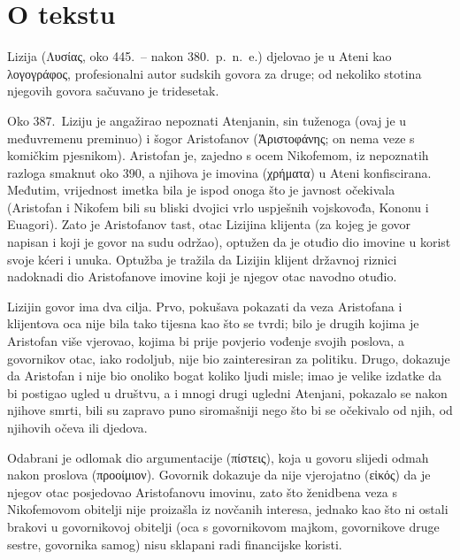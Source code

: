


\section*{O tekstu}

Lizija (Λυσίας, oko 445.\ – nakon 380.\ p.~n.~e.) djelovao je u Ateni kao λογογράφος, profesionalni autor sudskih govora za druge; od nekoliko stotina njegovih govora sačuvano je tridesetak.

Oko 387.\ Liziju je angažirao nepoznati Atenjanin, sin tuženoga (ovaj je u međuvremenu preminuo) i šogor Aristofanov (Ἀριστοφάνης; on nema veze s komičkim pjesnikom). Aristofan je, zajedno s ocem Nikofemom, iz nepoznatih razloga smaknut oko 390, a njihova je imovina (χρήματα) u Ateni konfiscirana. Međutim, vrijednost imetka bila je ispod onoga što je javnost očekivala (Aristofan i Nikofem bili su bliski dvojici vrlo uspješnih vojskovođa, Kononu i Euagori). Zato je Aristofanov tast, otac Lizijina klijenta (za kojeg je govor napisan i koji je govor na sudu održao), optužen da je otuđio dio imovine u korist svoje kćeri i unuka. Optužba je tražila da Lizijin klijent državnoj riznici nadoknadi dio Aristofanove imovine koji je njegov otac navodno otuđio.

Lizijin govor ima dva cilja. Prvo, pokušava pokazati da veza Aristofana i klijentova oca nije bila tako tijesna kao što se tvrdi; bilo je drugih kojima je Aristofan više vjerovao, kojima bi prije povjerio vođenje svojih poslova, a govornikov otac, iako rodoljub, nije bio zainteresiran za politiku. Drugo, dokazuje da Aristofan i nije bio onoliko bogat koliko ljudi misle; imao je velike izdatke da bi postigao ugled u društvu, a i mnogi drugi ugledni Atenjani, pokazalo se nakon njihove smrti, bili su zapravo puno siromašniji nego što bi se očekivalo od njih, od njihovih očeva ili djedova.

Odabrani je odlomak dio argumentacije (πίστεις), koja u govoru slijedi odmah nakon proslova (προοίμιον). Govornik dokazuje da nije vjerojatno (εἰκός) da je njegov otac posjedovao Aristofanovu imovinu, zato što ženidbena veza s Nikofemovom obitelji nije proizašla iz novčanih interesa, jednako kao što ni ostali brakovi u govornikovoj obitelji (oca s govornikovom majkom, govornikove druge sestre, govornika samog) nisu sklapani radi financijske koristi.


